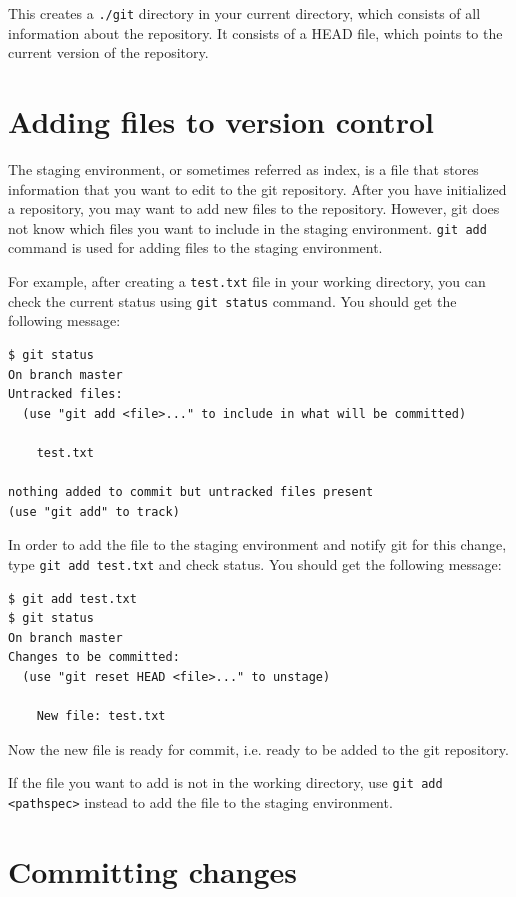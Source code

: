 \documentclass[12pt]{report}
\renewcommand\section[1]{{\chapter{#1}}}
\begin{document}
\bigskip
\noindent
This creates a \verb|./git| directory in your current directory, which consists of all information about the repository. It consists of a HEAD file, which points to the current version of the repository.


\section{Adding files to version control}

The staging environment, or sometimes referred as index, is a file that stores information that you want to edit to the git repository. After you have initialized a repository, you may want to add new files to the repository. However, git does not know which files you want to include in the staging environment. \texttt{git add} command is used for adding files to the staging environment.

For example, after creating a \texttt{test.txt} file in your working directory, you can check the current status using \texttt{git status} command. You should get the following message:

\begin{verbatim}
$ git status
On branch master
Untracked files:
  (use "git add <file>..." to include in what will be committed)
  
    test.txt

nothing added to commit but untracked files present
(use "git add" to track)
\end{verbatim}

In order to add the file to the staging environment and notify git for this change, type \texttt{git add test.txt} and check status. You should get the following message:

\begin{verbatim}
$ git add test.txt
$ git status
On branch master
Changes to be committed:
  (use "git reset HEAD <file>..." to unstage)
  
    New file: test.txt

\end{verbatim}

Now the new file is ready for commit, i.e. ready to be added to the git repository.

If the file you want to add is not in the working directory, use \texttt{git add <pathspec>} instead to add the file to the staging environment.

\section{Committing changes}
\end{document}
